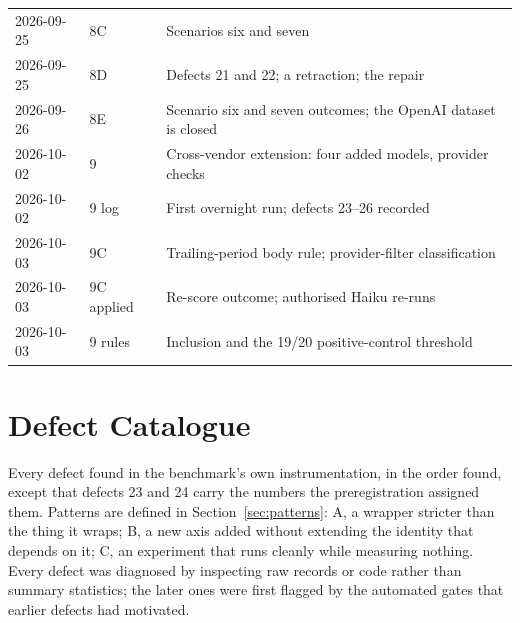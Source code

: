 \documentclass[11pt,oneside]{report}
\begin{document}
\begin{longtable}{@{}llp{}@{}}
2026-09-25 & 8C & Scenarios six and seven \\
2026-09-25 & 8D & Defects 21 and 22; a retraction; the repair \\
2026-09-26 & 8E & Scenario six and seven outcomes; the OpenAI dataset is closed \\
2026-10-02 & 9 & Cross-vendor extension: four added models, provider checks \\
2026-10-02 & 9 log & First overnight run; defects 23--26 recorded \\
2026-10-03 & 9C & Trailing-period body rule; provider-filter classification \\
2026-10-03 & 9C applied & Re-score outcome; authorised Haiku re-runs \\
2026-10-03 & 9 rules & Inclusion and the 19/20 positive-control threshold \\
\bottomrule
\end{longtable}

\chapter{Defect Catalogue}
\label{app:defects}

Every defect found in the benchmark's own instrumentation, in the order
found, except that defects 23 and 24 carry the numbers the preregistration
assigned them. Patterns are defined in Section~\ref{sec:patterns}: A, a wrapper
stricter than the thing it wraps; B, a new axis added without extending the
identity that depends on it; C, an experiment that runs cleanly while measuring
nothing. Every defect was diagnosed by inspecting raw records or code rather
than summary statistics; the later ones were first flagged by the automated
gates that earlier defects had motivated.
\end{document}

